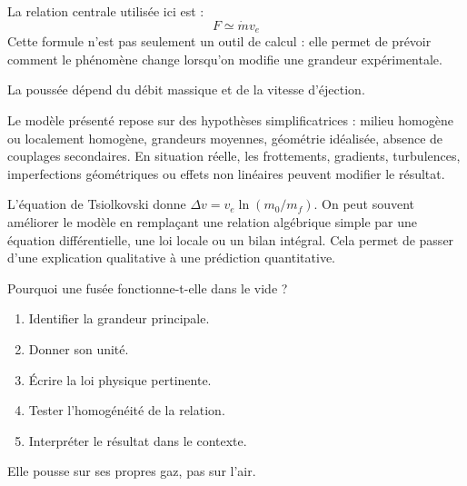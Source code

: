\documentclass[11pt,a4paper]{article}
\begin{document}
\begin{theorembox}
La relation centrale utilisée ici est :
\[
F\simeq \dot m v_e
\]
Cette formule n'est pas seulement un outil de calcul : elle permet de prévoir comment le phénomène change lorsqu'on modifie une grandeur expérimentale.
\end{theorembox}

\begin{odgbox}
La poussée dépend du débit massique et de la vitesse d'éjection.
\end{odgbox}

\begin{attentionbox}
Le modèle présenté repose sur des hypothèses simplificatrices : milieu homogène ou localement homogène, grandeurs moyennes, géométrie idéalisée, absence de couplages secondaires. En situation réelle, les frottements, gradients, turbulences, imperfections géométriques ou effets non linéaires peuvent modifier le résultat.
\end{attentionbox}

\begin{approfondissementbox}
L'équation de Tsiolkovski donne $\Delta v=v_e\ln(m_0/m_f)$.
On peut souvent améliorer le modèle en remplaçant une relation algébrique simple par une équation différentielle, une loi locale ou un bilan intégral. Cela permet de passer d'une explication qualitative à une prédiction quantitative.
\end{approfondissementbox}

\begin{exercicebox}
Pourquoi une fusée fonctionne-t-elle dans le vide ?
\begin{enumerate}
  \item Identifier la grandeur principale.
  \item Donner son unité.
  \item Écrire la loi physique pertinente.
  \item Tester l'homogénéité de la relation.
  \item Interpréter le résultat dans le contexte.
\end{enumerate}
\end{exercicebox}

\begin{corrigebox}[Indication]
Elle pousse sur ses propres gaz, pas sur l'air.
\end{corrigebox}
\end{document}
